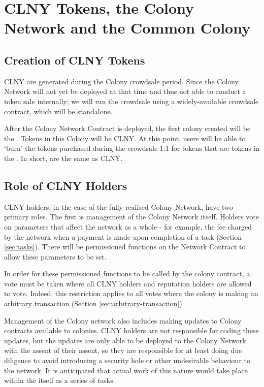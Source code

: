 \section{CLNY Tokens, the Colony Network and the Common Colony}\label{sec:clny}

\subsection{Creation of CLNY Tokens}
CLNY are generated during the Colony crowdsale period. Since the Colony Network will not yet be deployed at that time and thus not able to conduct a token sale internally; we will run the crowdsale using a widely-available crowdsale contract, which will be standalone.

After the Colony Network Contract is deployed, the first colony created will be the \rc. Tokens in this Colony will be CLNY. At this point, users will be able to `burn' the tokens purchased during the crowdsale 1:1 for tokens that are tokens in the \rc. In short, \rcts are the same as CLNY.

\subsection{Role of CLNY Holders}
CLNY holders, in the case of the fully realised Colony Network, have two primary roles. The first is management of the Colony Network itself. Holders vote on parameters that affect the network as a whole - for example, the fee charged by the network when a payment is made upon completion of a task (Section \ref{sec:tasks}). There will be permissioned functions on the Network Contract to allow these parameters to be set. 

In order for these permissioned \rc functions to be called by the colony contract, a vote must be taken where all CLNY holders and reputation holders are allowed to vote. Indeed, this restriction applies to all votes where the colony is making an arbitrary transaction (Section \ref{sec:arbitrary-transaction}).

Management of the Colony network also includes making updates to Colony contracts available to colonies. CLNY holders are not responsible for coding these updates, but the updates are only able to be deployed to the Colony Network with the assent of their assent, so they are responsible for at least doing due diligence to avoid introducing a security hole or other undesirable behaviour to the network. It is anticipated that actual work of this nature would take place within the \rc itself as a series of tasks.

